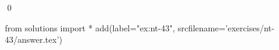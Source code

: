 
\begin{ex} 
  \label{ex:nt-43}
  
  \qed
\end{ex} 
\begin{python0}
from solutions import *
add(label="ex:nt-43",
    srcfilename='exercises/nt-43/answer.tex') 
\end{python0}
